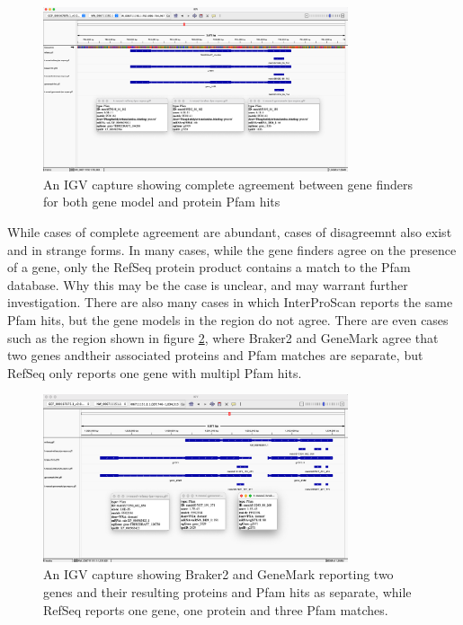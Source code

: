 \begin{figure}
  \centering
  \includegraphics[width=0.8\textwidth]{figures/igv/ips-basic-agree.png}
  \caption[Agreeing Pfam matches]{An IGV capture showing complete
    agreement between gene finders for both gene model and protein
    Pfam hits}
  \label{fig:basic-agree.png}
\end{figure}

While cases of complete agreement are abundant, cases of disagreemnt
also exist and in strange forms. In many cases, while the gene finders
agree on the presence of a gene, only the RefSeq protein product
contains a match to the Pfam database. Why this may be the case is
unclear, and may warrant further investigation. There are also many
cases in which InterProScan reports the same Pfam hits, but the gene
models in the region do not agree. There are even cases such as the
region shown in figure \ref{fig:agree-bizarre2}, where Braker2 and
GeneMark agree that two genes andtheir associated proteins and Pfam
matches are separate, but RefSeq only reports one gene with multipl
Pfam hits.

\begin{figure}[!]
  \centering
  \includegraphics[width=0.8\textwidth]{figures/igv/ips-model-disagree2.png}
  \caption[Split Pfam matches]{An IGV capture showing Braker2 and
    GeneMark reporting two genes and their resulting proteins and
    Pfam hits as separate, while RefSeq reports one gene, one protein
    and three Pfam matches.}
  \label{fig:agree-bizarre2}

\end{figure}
